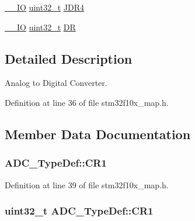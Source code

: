 \begin{DoxyCompactItemize}
\item 
\hyperlink{group___c_m_s_i_s___c_m3__core__definitions_gaec43007d9998a0a0e01faede4133d6be}{\+\_\+\+\_\+\+IO} \hyperlink{_p_e___types_8h_a33594304e786b158f3fb30289278f5af}{uint32\+\_\+t} \hyperlink{struct_a_d_c___type_def_abae6e9d688b16ef350878998f5e21c0b}{J\+D\+R4}
\item 
\hyperlink{group___c_m_s_i_s___c_m3__core__definitions_gaec43007d9998a0a0e01faede4133d6be}{\+\_\+\+\_\+\+IO} \hyperlink{_p_e___types_8h_a33594304e786b158f3fb30289278f5af}{uint32\+\_\+t} \hyperlink{struct_a_d_c___type_def_a84114accead82bd11a0e12a429cdfed9}{DR}
\end{DoxyCompactItemize}


\subsection{Detailed Description}
Analog to Digital Converter. 

Definition at line 36 of file stm32f10x\+\_\+map.\+h.



\subsection{Member Data Documentation}
\subsubsection[{\texorpdfstring{C\+R1}{CR1}}]{ A\+D\+C\+\_\+\+Type\+Def\+::\+C\+R1}\hypertarget{struct_a_d_c___type_def_ad92260b54f77ad20d6c805d4d33d6ebb}{}\label{struct_a_d_c___type_def_ad92260b54f77ad20d6c805d4d33d6ebb}


Definition at line 39 of file stm32f10x\+\_\+map.\+h.

\subsubsection[{\texorpdfstring{C\+R1}{CR1}}]{ {\bf uint32\+\_\+t} A\+D\+C\+\_\+\+Type\+Def\+::\+C\+R1}\hypertarget{struct_a_d_c___type_def_a89b1ff4376683dd2896ea8b32ded05b2}{}\label{struct_a_d_c___type_def_a89b1ff4376683dd2896ea8b32ded05b2}


